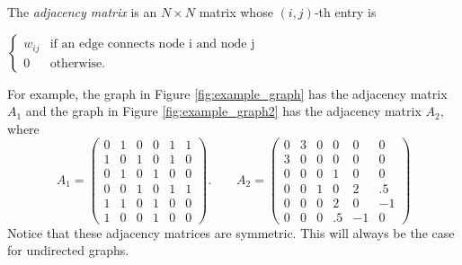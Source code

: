\begin{definition} The \emph{adjacency matrix} is an $N \times N$ matrix whose $(i,j)$-th entry is
\begin{center}
	$ \begin{cases}  w_{ij} & \mbox{if an edge connects node i and node j} \\ 0 & \mbox{otherwise.} \end{cases}$
\end{center}
\end{definition}

For example, the graph in Figure \ref{fig:example_graph} has the adjacency matrix $A_1$ and the graph in Figure \ref{fig:example_graph2} has the adjacency matrix $A_2$, where
\[
A_1 = \begin{pmatrix}
0 & 1 & 0 & 0 & 1 & 1\\
1 & 0 & 1 & 0 & 1 & 0\\
0 & 1 & 0 & 1 & 0 & 0\\
0 & 0 & 1 & 0 & 1 & 1\\
1 & 1 & 0 & 1 & 0 & 0\\
1 & 0 & 0 & 1 & 0 & 0
\end{pmatrix}. \qquad A_2 = 
 \begin{pmatrix}
0 & 3 & 0 & 0 & 0 & 0\\
3 & 0 & 0 & 0 & 0 & 0\\
0 & 0 & 0 & 1 & 0 & 0\\
0 & 0 & 1 & 0 & 2 & .5\\
0 & 0 & 0 & 2 & 0 & -1\\
0 & 0 & 0 & .5 & -1 & 0
\end{pmatrix}
\]
Notice that these adjacency matrices are symmetric. This will always be the case for undirected graphs.

